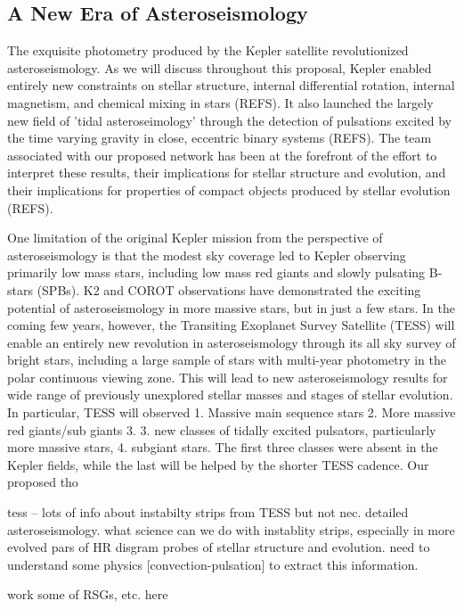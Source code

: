 {\color{blue}
\subsection{A New Era of Asteroseismology}

The exquisite photometry produced by the Kepler satellite revolutionized asteroseismology.   As we will discuss throughout this proposal, Kepler enabled entirely new constraints on stellar structure, internal differential rotation, internal magnetism, and chemical mixing in stars (REFS).  It also launched the largely new field of 'tidal asteroseimology' through the detection of pulsations excited by the time varying gravity in close, eccentric binary systems (REFS). The team associated with our proposed network has been at the forefront of the effort to interpret these results, their implications for stellar structure and evolution, and their implications for properties of compact objects produced by stellar evolution (REFS).   

One limitation of the original Kepler mission from the perspective of asteroseismology is that the modest sky coverage led to Kepler observing primarily low mass stars, including low mass red giants and slowly pulsating B-stars (SPBs).  K2 and COROT observations have demonstrated the exciting potential of asteroseismology in more massive stars, but in just a few stars.   In the coming few years, however, the Transiting Exoplanet Survey Satellite (TESS) will enable an entirely new revolution in asteroseismology through its all sky survey of bright stars, including a large sample of stars with multi-year photometry in the polar continuous viewing zone.   This will lead to new asteroseismology results for wide range of previously unexplored stellar masses and stages of stellar evolution.   In particular, TESS will observed 1.  Massive main sequence stars 2. More massive red giants/sub giants 3. 3.  new classes of tidally excited pulsators, particularly more massive stars, 4. subgiant stars.   The first three classes were absent in the Kepler fields, while the last will be helped by the shorter TESS cadence.   Our proposed tho

tess -- lots of info about instabilty strips from TESS but not nec. detailed asteroseismology.  what science can we do with instablity strips, especially in more evolved pars of HR disgram  probes of stellar structure and evolution.   need to understand some physics [convection-pulsation] to extract this information.   

work some of RSGs, etc. here




}